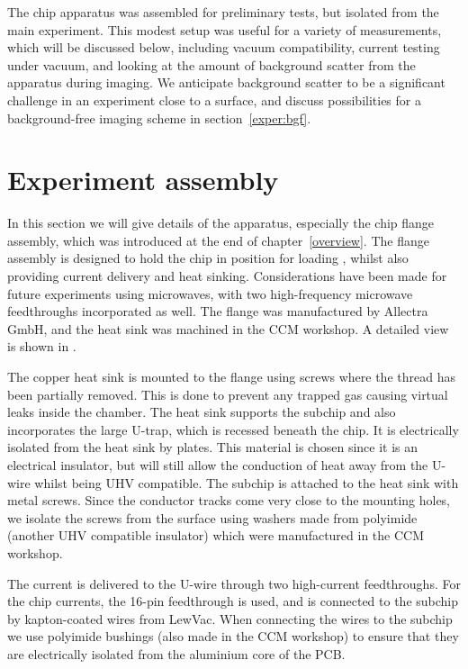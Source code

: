The chip apparatus was assembled for preliminary tests, but isolated from the 
main \CaF{} experiment. This modest setup was useful for a variety of
measurements, which will be discussed below, including vacuum compatibility,
current testing under vacuum, and looking at the amount of background scatter
from the apparatus during imaging. We anticipate background scatter to be a
significant challenge in an experiment close to a surface, and discuss
possibilities for a background-free imaging scheme in
section~\ref{exper:bgf}.

\section{Experiment assembly}

In this section we will give details of the apparatus, especially the chip
flange assembly, which was introduced at the end of chapter~\ref{overview}. The
flange assembly is designed to hold the chip in position for loading \CaF{},
whilst also providing current delivery and heat sinking. Considerations have
been made for future experiments using microwaves, with two high-frequency
microwave feedthroughs incorporated as well. The flange was manufactured by
Allectra GmbH, and the heat sink was machined in the CCM workshop.  A detailed
view is shown in .

The copper heat sink is mounted to the flange using screws where the thread has
been partially removed. This is done to prevent any trapped gas causing virtual
leaks inside the chamber. The heat sink supports the subchip and also
incorporates the large U-trap, which is recessed beneath the chip. It is
electrically isolated from the heat sink by \AlN{} plates. This material is
chosen since it is an electrical insulator, but will still allow the conduction
of heat away from the U-wire whilst being UHV compatible. The subchip is
attached to the heat sink with metal screws. Since the conductor tracks come
very close to the mounting holes, we isolate the screws from the surface using
washers made from polyimide (another UHV compatible insulator) which were
manufactured in the CCM workshop.

The current is delivered to the U-wire through two high-current feedthroughs.
For the chip currents, the 16-pin feedthrough is used, and is connected to the
subchip by kapton-coated wires from LewVac. When connecting the wires to the
subchip we use polyimide bushings (also made in the CCM workshop) to ensure
that they are electrically isolated from the aluminium core of the PCB.

